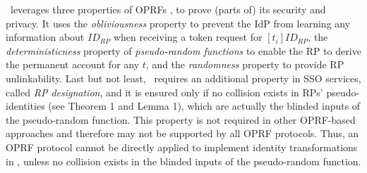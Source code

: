 \usso\ leverages three properties of OPRFs \cite{oprf-proved,voprf-proved}, %
 to prove (parts of) its security and privacy. %
It uses the \emph{obliviousness} property to prevent the IdP from learning any information about $ID_{RP}$ when receiving a token request for $[t_i]ID_{RP}$, the \emph{deterministicness} property of \emph{pseudo-random functions} to enable the RP to derive the permanent account for any $t$,
and the \emph{randomness} property to provide RP unlinkability.
Last but not least, \usso\ requires an additional property in SSO services, called \emph{RP designation},
 and it is ensured only if no collision exists in RPs' pseudo-identities (see Theorem 1 and Lemma 1), which are actually the blinded inputs of the pseudo-random function.
This property is not required in other OPRF-based approaches and therefore may not be supported by all OPRF protocols.
Thus, an OPRF protocol cannot be directly applied to implement identity transformations in \usso, unless no collision exists in the blinded inputs of the pseudo-random function.



